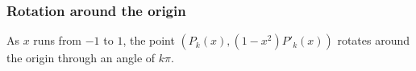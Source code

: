 \documentclass[9pt]{beamer}
\begin{document}
\begin{frame}[t]
 \frametitle{Rotation around the origin}
 
 As $x$ runs from $-1$ to $1$, the point $(P_k(x),(1-x^2)P'_k(x))$
 rotates around the origin through an angle of $k\pi$. 
 \begin{center}
\end{center}
\end{frame}
\end{document}
